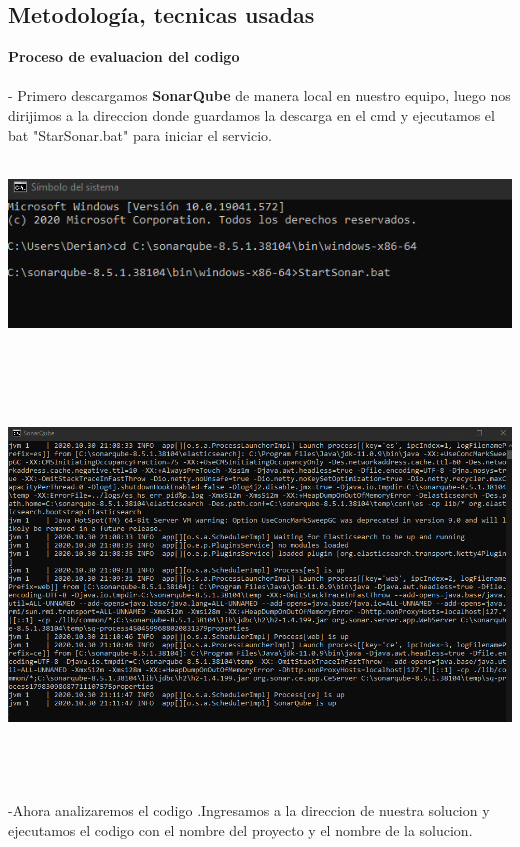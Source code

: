 \documentclass[12pt,letterpaper]{article}
\begin{document}
    \subsection{Metodolog\'ia, tecnicas usadas}
    \textbf{Proceso de evaluacion del codigo}
    \\
    \\ - Primero descargamos \textbf{SonarQube} de manera local en nuestro equipo, 
   luego nos dirijimos a la direccion donde guardamos la descarga en el cmd y ejecutamos el bat
    "StarSonar.bat" para iniciar el servicio. 
    \begin{center}
        \includegraphics[width=15cm, height=5cm]{img/star.png}  
    \end{center}
    \begin{center}
        \includegraphics[width=15cm, height=11cm]{img/star2.png}  
    \end{center}

    -Ahora analizaremos el codigo .Ingresamos
     a la direccion de nuestra solucion y ejecutamos el codigo con el nombre
      del proyecto y el nombre de la solucion.
    
\end{document}
